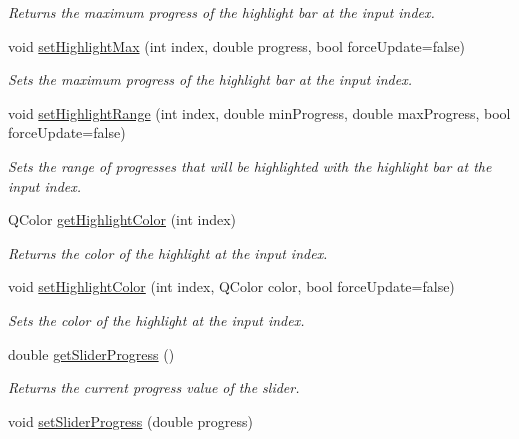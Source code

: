 \begin{DoxyCompactItemize}
\begin{DoxyCompactList}\small\item\em Returns the maximum progress of the highlight bar at the input index. \end{DoxyCompactList}\item 
void \hyperlink{class_progress_widget_ad3172072e782a4afa6937a556cca5b9e}{set\-Highlight\-Max} (int index, double progress, bool force\-Update=false)
\begin{DoxyCompactList}\small\item\em Sets the maximum progress of the highlight bar at the input index. \end{DoxyCompactList}\item 
void \hyperlink{class_progress_widget_ad46a886518f8b18a2ef9a434a1d74066}{set\-Highlight\-Range} (int index, double min\-Progress, double max\-Progress, bool force\-Update=false)
\begin{DoxyCompactList}\small\item\em Sets the range of progresses that will be highlighted with the highlight bar at the input index. \end{DoxyCompactList}\item 
\hypertarget{class_progress_widget_a5e75b0a5208e25f05602b5fc01123536}{Q\-Color \hyperlink{class_progress_widget_a5e75b0a5208e25f05602b5fc01123536}{get\-Highlight\-Color} (int index)}\label{class_progress_widget_a5e75b0a5208e25f05602b5fc01123536}

\begin{DoxyCompactList}\small\item\em Returns the color of the highlight at the input index. \end{DoxyCompactList}\item 
void \hyperlink{class_progress_widget_aea4461f0b45753da8eee91645813786a}{set\-Highlight\-Color} (int index, Q\-Color color, bool force\-Update=false)
\begin{DoxyCompactList}\small\item\em Sets the color of the highlight at the input index. \end{DoxyCompactList}\item 
\hypertarget{class_progress_widget_a7747c4a2d33a9e8180021bcc0fdfe5e0}{double \hyperlink{class_progress_widget_a7747c4a2d33a9e8180021bcc0fdfe5e0}{get\-Slider\-Progress} ()}\label{class_progress_widget_a7747c4a2d33a9e8180021bcc0fdfe5e0}

\begin{DoxyCompactList}\small\item\em Returns the current progress value of the slider. \end{DoxyCompactList}\item 
\hypertarget{class_progress_widget_a3074b24b4cf39414d63b1232d204b851}{void \hyperlink{class_progress_widget_a3074b24b4cf39414d63b1232d204b851}{set\-Slider\-Progress} (double progress)}\label{class_progress_widget_a3074b24b4cf39414d63b1232d204b851}


\end{DoxyCompactItemize}
